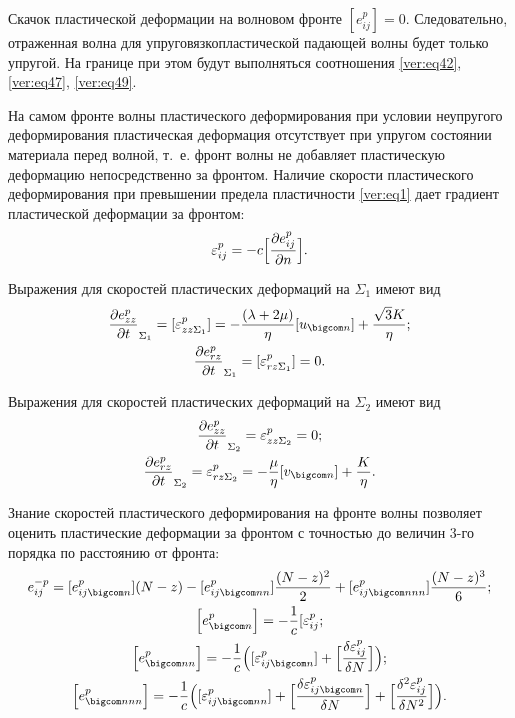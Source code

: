 Скачок пластической деформации на волновом фронте $[e_{ij}^p]=0$. Следовательно, отраженная волна для упруговязкопластической падающей волны будет только упругой. На границе при этом будут выполняться соотношения \eqref{ver:eq42}, \eqref{ver:eq47}, \eqref{ver:eq49}.

\smallskip

На самом фронте волны пластического деформирования при условии \cite{ver:bib5} неупругого деформирования пластическая деформация отсутствует при упругом состоянии материала перед волной, т.~е. фронт волны не добавляет пластическую деформацию непосредственно за фронтом. Наличие скорости пластического деформирования при превышении предела пластичности \eqref{ver:eq1} дает градиент пластической деформации за фронтом:
\begin{equation}
\label{ver:eq52}
\varepsilon_{ij}^p=-c\Bigl[\frac{\partial e_{ij}^p}{\partial n}\Bigr].
\end{equation}

Выражения для скоростей пластических деформаций на $\Sigma_1$ имеют вид
\begin{gather}
\label{ver:eq53}
\frac{\partial e_{zz}^{p}}{\partial t}_{\Sigma_1}=[\varepsilon_{zz\Sigma_1}^{p}]=-\frac{ (\lambda+2 \mu)}{ \eta}[u_{\bigcom n}]+\frac{ \sqrt{3} K }{ \eta};
\\
\label{ver:eq54}
\frac{\partial e_{rz}^{p}}{\partial t}_{\Sigma_1}=[\varepsilon_{rz\Sigma_1}^{p}]=0.
\end{gather}

Выражения для скоростей пластических деформаций на $\Sigma_2$ имеют вид
\begin{gather}
\label{ver:eq55}
\frac{\partial e_{zz}^{p}}{\partial t}_{\Sigma_2}=\varepsilon_{zz\Sigma_2}^{p}=0;
\\
\label{ver:eq56}
\frac{\partial e_{rz}^{p}}{\partial t}_{\Sigma_2}=\varepsilon_{rz\Sigma_2}^{p}=-\frac{ \mu}{ \eta}[v_{\bigcom n}]+\frac{ K}{ \eta}.
\end{gather}

Знание скоростей пластического деформирования на фронте волны позволяет оценить пластические деформации за фронтом с точностью до величин 3-го порядка по расстоянию от фронта:
\begin{gather}
\label{ver:eq57}
e_{ij}^{-p}=[e_{ij\bigcom n}^p](N-z)-[e_{ij\bigcom nn}^p]\frac{(N-z)^2}{2}+[e_{ij\bigcom nnn}^p]\frac{(N-z)^3}{6};
\\
\label{ver:eq58}
\left[e_{\bigcom n}^p\right]=-\frac{1}{c}[\varepsilon_{ij}^p;
\\
\label{ver:eq60}
\left[e_{\bigcom nn}^p\right]=-\frac{1}{c}
\Bigl([\varepsilon_{ij\bigcom n}^p]+\Bigl[\frac{\delta \varepsilon_{ij}^p}{\delta N}\Bigr]\Bigr);
\\
\label{ver:eq60}
\left[e_{\bigcom nnn}^p\right]=-\frac{1}{c}
\Bigl([\varepsilon_{ij\bigcom nn}^p]+\Bigl[\frac{\delta \varepsilon_{ij\bigcom n}^p}{\delta N}\Bigr]+\Bigl[\frac{\delta^2\varepsilon_{ij}^p}{\delta N^2}\Bigr]\Bigr).
\end{gather}

